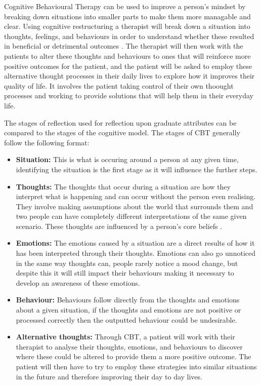 \documentclass{l4proj}
\begin{document}
Cognitive Behavioural Therapy can be used to improve a person's mindset by breaking down situations into smaller parts to make them more managable 
and clear. Using cognitive restructuring a therapist will break down a situation into thoughts, feelings, and behaviours in order to understand whether
these resulted in beneficial or detrimental outcomes \citep{nhs_cognitive_2017}. The therapist will then work with the patients to alter these thoughts
and behaviours to ones that will reinforce more positive outcomes for the patient, and the patient will be asked to employ these alternative thought
processes in their daily lives to explore how it improves their quality of life. It involves the patient taking control of their own thoought processes
and working to provide solutions that will help them in their everyday life.

The stages of reflection used for reflection upon graduate attributes can be compared to the stages of the cognitive model.
The stages of CBT generally follow the following format:

\begin{itemize}
    \item \textbf{Situation:} This is what is occuring around a person at any given time, identifying the situation is the first stage as it will influence
    the further steps.
    \item \textbf{Thoughts:} The thoughts that occur during a situation are how they interpret what is happening and can occur without the person even 
    realising. They involve making assumptions about the world that surrounds them and two people can have completely different interpretations of the 
    same given scenario. These thoughts are influenced by a person's core beliefs \citep{therapist_aid_psychoeducation}. 
    \item \textbf{Emotions:} The emotions caused by a situation are a direct results of how it has been interpreted through their thoughts. Emotions can also 
    go unnoticed in the same way thoughts can, people rarely notice a mood change, but despite this it will still impact their behaviours making it necessary 
    to develop an awareness of these emotions.
    \item \textbf{Behaviour:} Behaviours follow directly from the thoughts and emotions about a given situation, if the thoughts and emotions are not positive
    or processed correctly then the outputted behaviour could be undesirable.
    \item \textbf{Alternative thoughts:} Through CBT, a patient will work with their therapist to analyse their thoughts, emotions, and behaviours to discover
    where these could be altered to provide them a more positive outcome. The patient will then have to try to employ these strategies into similar situations
    in the future and therefore improving their day to day lives.
\end{itemize}
\end{document}
